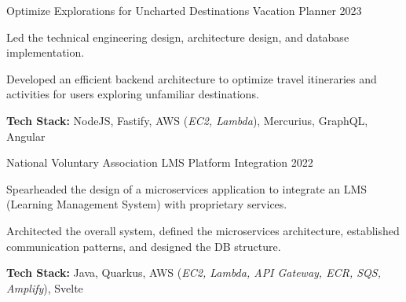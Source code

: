 

\begin{cventries}

  \cventry
    {Optimize Explorations for Uncharted Destinations} %
    {Vacation Planner} %
    {} %
    {2023} %
    {
      \begin{cvitems} %
        \item {Led the technical engineering design, architecture design, and database implementation.}
        \item {Developed an efficient backend architecture to optimize travel itineraries and activities for users exploring unfamiliar destinations.}
        \item {\textbf{Tech Stack:} NodeJS, Fastify, AWS (\textit{EC2, Lambda}), Mercurius, GraphQL, Angular}
      \end{cvitems}
    }
    
  \cventry
    {National Voluntary Association} %
    {LMS Platform Integration} %
    {} %
    {2022} %
    {
      \begin{cvitems} %
        \item {Spearheaded the design of a microservices application to integrate an LMS (Learning Management System) with proprietary services.}
        \item {Architected the overall system, defined the microservices architecture, established communication patterns, and designed the DB structure.}
        \item {\textbf{Tech Stack:} Java, Quarkus, AWS (\textit{EC2, Lambda, API Gateway, ECR, SQS, Amplify}), Svelte}
      \end{cvitems}
    }


\end{cventries}
